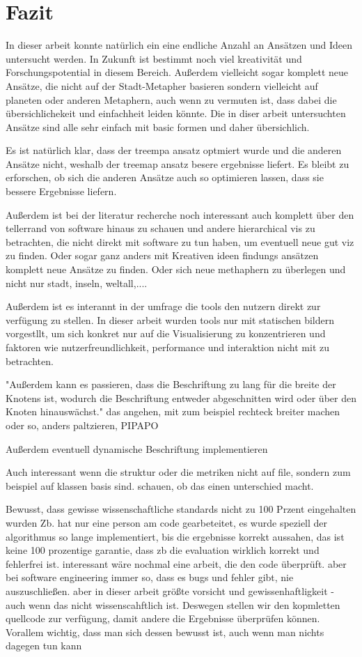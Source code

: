 \section{Fazit} \label{sec:Fazit}
In dieser arbeit konnte natürlich ein eine endliche Anzahl an Ansätzen und Ideen untersucht werden. In Zukunft ist bestimmt noch viel kreativität und Forschungspotential in diesem Bereich. Außerdem vielleicht sogar komplett neue Ansätze, die nicht auf der Stadt-Metapher basieren sondern vielleicht auf planeten oder anderen Metaphern, auch wenn zu vermuten ist, dass dabei die übersichlichekeit und einfachheit leiden könnte. Die in diser arbeit untersuchten Ansätze sind alle sehr einfach mit basic formen und daher übersichlich.


Es ist natürlich klar, dass der treempa ansatz optmiert wurde und die anderen Ansätze nicht, weshalb der treemap ansatz besere ergebnisse liefert. 
Es bleibt zu erforschen, ob sich die anderen Ansätze auch so optimieren lassen, dass sie bessere Ergebnisse liefern.


Außerdem ist bei der literatur recherche noch interessant auch komplett über den tellerrand von software hinaus zu schauen und andere hierarchical vis zu betrachten, die nicht direkt mit software zu tun haben, um eventuell neue gut viz zu finden. Oder sogar ganz anders mit Kreativen ideen findungs ansätzen komplett neue Ansätze zu finden. Oder sich neue methaphern zu überlegen und nicht nur stadt, inseln, weltall,....

Außerdem ist es interannt in der umfrage die tools den nutzern direkt zur verfügung zu stellen. In dieser arbeit wurden tools nur mit statischen bildern vorgestllt, um sich konkret nur auf die Visualisierung zu konzentrieren und faktoren wie nutzerfreundlichkeit, performance und interaktion nicht mit zu betrachten.

"Außerdem kann es passieren, dass die Beschriftung zu lang für die breite der Knotens ist, wodurch die Beschriftung entweder abgeschnitten wird oder über den Knoten hinauswächst." das angehen, mit zum beispiel rechteck breiter machen oder so, anders paltzieren, PIPAPO

Außerdem eventuell dynamische Beschriftung implementieren


Auch interessant wenn die struktur oder die metriken nicht auf file, sondern zum beispiel auf klassen basis sind. schauen, ob das einen unterschied macht.


Bewusst, dass gewisse wissenschaftliche standards nicht zu 100 Przent eingehalten wurden
Zb. hat nur eine person am code gearbeteitet, es wurde speziell der algorithmus so lange implementiert, bis die ergebnisse korrekt aussahen, das ist keine 100 prozentige garantie, dass zb die evaluation wirklich korrekt und fehlerfrei ist. interessant wäre nochmal eine arbeit, die den code überprüft. aber bei software engineering immer so, dass es bugs und fehler gibt, nie auszuschließen. aber in dieser arbeit größte vorsicht und gewissenhaftligkeit - auch wenn das nicht wissenscahftlich ist. Deswegen stellen wir den kopmletten quellcode zur verfügung, damit andere die Ergebnisse überprüfen können.
Vorallem wichtig, dass man sich dessen bewusst ist, auch wenn man nichts dagegen tun kann